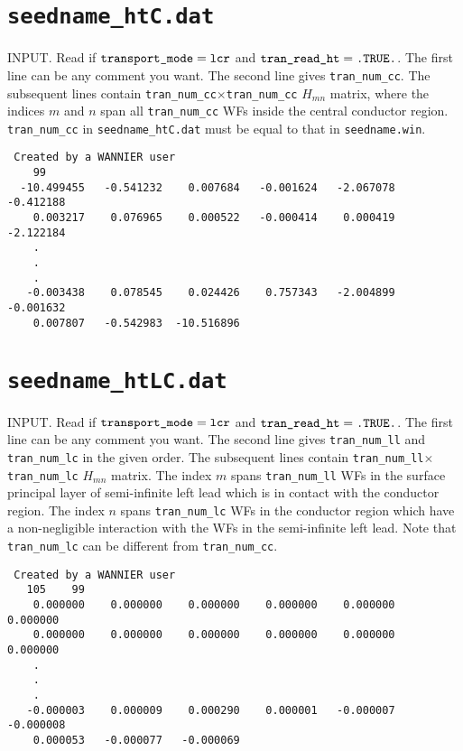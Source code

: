 \section{{\tt seedname\_htC.dat}}

INPUT.
Read if $\verb#transport_mode#=\verb#lcr#$
and $\verb#tran_read_ht#=\verb#.TRUE.#$.
The first line can be any comment you want.
The second line gives \verb#tran_num_cc#.
The subsequent lines contain 
\verb#tran_num_cc#$\times$\verb#tran_num_cc#
$H_{mn}$ matrix, where the indices
$m$ and $n$ span all \verb#tran_num_cc# WFs
inside the central conductor region.
\verb#tran_num_cc# in \verb#seedname_htC.dat#
must be equal to
that in \verb#seedname.win#. 

\begin{verbatim}
 Created by a WANNIER user
    99
  -10.499455   -0.541232    0.007684   -0.001624   -2.067078   -0.412188
    0.003217    0.076965    0.000522   -0.000414    0.000419   -2.122184
    .
    .
    .
   -0.003438    0.078545    0.024426    0.757343   -2.004899   -0.001632
    0.007807   -0.542983  -10.516896
\end{verbatim}

\section{{\tt seedname\_htLC.dat}}

INPUT.
Read if $\verb#transport_mode#=\verb#lcr#$
and $\verb#tran_read_ht#=\verb#.TRUE.#$.
The first line can be any comment you want.
The second line gives
\verb#tran_num_ll#
and \verb#tran_num_lc#
in the given order.
The subsequent lines contain 
\verb#tran_num_ll#$\times$\verb#tran_num_lc#
$H_{mn}$ matrix.
The index $m$ spans \verb#tran_num_ll# WFs
in the surface principal layer of semi-infinite left lead
which is in contact with the conductor region.
The index $n$ spans \verb#tran_num_lc# WFs
in the conductor region which
have a non-negligible interaction with
the WFs in the semi-infinite left lead.
Note that \verb#tran_num_lc# 
can be different from \verb#tran_num_cc#.


\begin{verbatim}
 Created by a WANNIER user
   105    99
    0.000000    0.000000    0.000000    0.000000    0.000000    0.000000
    0.000000    0.000000    0.000000    0.000000    0.000000    0.000000
    .
    .
    .
   -0.000003    0.000009    0.000290    0.000001   -0.000007   -0.000008
    0.000053   -0.000077   -0.000069
\end{verbatim}

